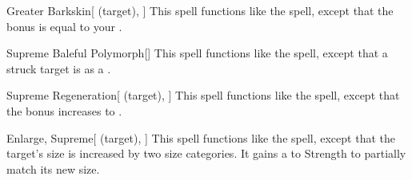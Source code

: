 \lowercase{\hypertarget{spell:Greater Barkskin}{}}\label{spell:Greater Barkskin}
\begin{attuneability}[\nth{6}]{\hypertarget{spell:Greater Barkskin}{Greater Barkskin}}[ (target), ]
This spell functions like the  spell, except that the bonus is equal to your .
\end{attuneability}
\vspace{0.25em}



\lowercase{\hypertarget{spell:Supreme Baleful Polymorph}{}}\label{spell:Supreme Baleful Polymorph}
\begin{freeability}[\nth{6}]{\hypertarget{spell:Supreme Baleful Polymorph}{Supreme Baleful Polymorph}}[]
This spell functions like the  spell, except that a struck target is  as a .
\end{freeability}
\vspace{0.25em}



\lowercase{\hypertarget{spell:Supreme Regeneration}{}}\label{spell:Supreme Regeneration}
\begin{attuneability}[\nth{6}]{\hypertarget{spell:Supreme Regeneration}{Supreme Regeneration}}[ (target), ]
This spell functions like the  spell, except that the bonus increases to .
\end{attuneability}
\vspace{0.25em}



\lowercase{\hypertarget{spell:Enlarge, Supreme}{}}\label{spell:Enlarge, Supreme}
\begin{attuneability}[\nth{7}]{\hypertarget{spell:Enlarge, Supreme}{Enlarge, Supreme}}[ (target), ]
This spell functions like the  spell, except that the target's size is increased by two size categories.
It gains a   to Strength to partially match its new size.
\end{attuneability}
\vspace{0.25em}



